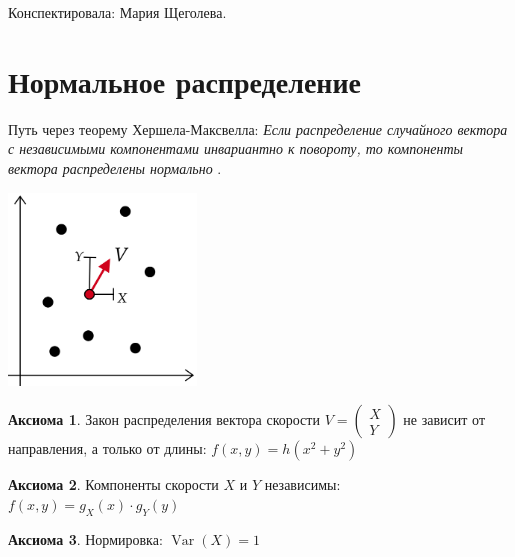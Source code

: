 \documentclass[12pt]{article} %
\theoremstyle{definition} %
\DeclareMathOperator{\Var}{Var}
\begin{document}
Конспектировала: Мария Щеголева.

\section{Нормальное распределение}


Путь через теорему Хершела-Максвелла: \textit{Если распределение случайного вектора с независимыми компонентами инвариантно к повороту, то компоненты вектора распределены нормально }.

\begin{center}
    \includegraphics[width=5cm]{images/pic01_06.png}
\end{center}

\newtheorem{axiom}{Аксиома}
\begin{axiom}\label{ax1}
    Закон распределения вектора скорости $ V = \begin{pmatrix} X \\ Y \end{pmatrix}$ не зависит от направления, а только от длины: $f(x,y) = h(x^2+y^2)$
\end{axiom}

\begin{axiom}\label{ax2}
    Компоненты скорости $X$ и $Y$ независимы: $ f(x,y) = g_X(x)\cdot{g_Y(y)} $
\end{axiom}

\begin{axiom}\label{ax3}
    Нормировка: $\Var(X) = 1$
\end{axiom}
\end{document}
